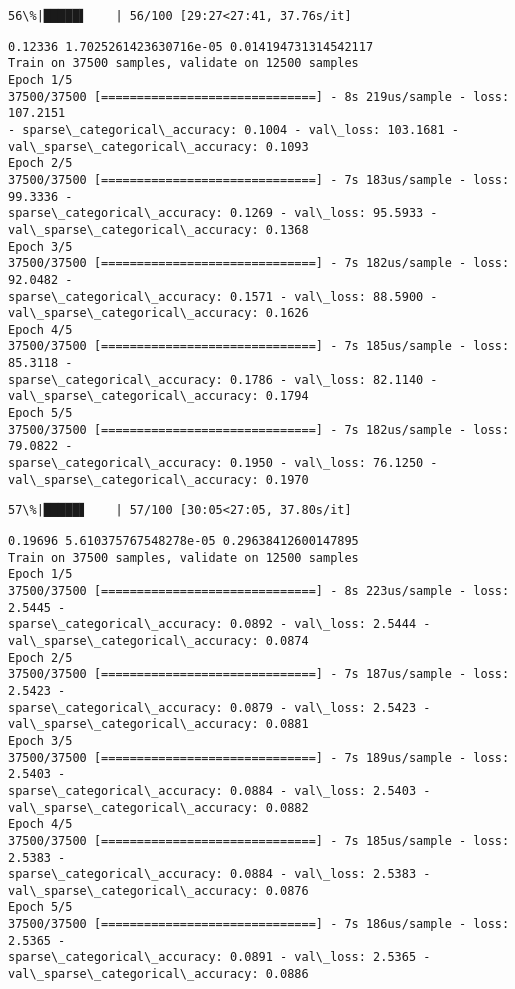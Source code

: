 \documentclass[11pt]{article}
\begin{document}
    \begin{Verbatim}[commandchars=\\\{\}]
 56\%|█████▌    | 56/100 [29:27<27:41, 37.76s/it]
    \end{Verbatim}

    \begin{Verbatim}[commandchars=\\\{\}]
0.12336 1.7025261423630716e-05 0.014194731314542117
Train on 37500 samples, validate on 12500 samples
Epoch 1/5
37500/37500 [==============================] - 8s 219us/sample - loss: 107.2151
- sparse\_categorical\_accuracy: 0.1004 - val\_loss: 103.1681 -
val\_sparse\_categorical\_accuracy: 0.1093
Epoch 2/5
37500/37500 [==============================] - 7s 183us/sample - loss: 99.3336 -
sparse\_categorical\_accuracy: 0.1269 - val\_loss: 95.5933 -
val\_sparse\_categorical\_accuracy: 0.1368
Epoch 3/5
37500/37500 [==============================] - 7s 182us/sample - loss: 92.0482 -
sparse\_categorical\_accuracy: 0.1571 - val\_loss: 88.5900 -
val\_sparse\_categorical\_accuracy: 0.1626
Epoch 4/5
37500/37500 [==============================] - 7s 185us/sample - loss: 85.3118 -
sparse\_categorical\_accuracy: 0.1786 - val\_loss: 82.1140 -
val\_sparse\_categorical\_accuracy: 0.1794
Epoch 5/5
37500/37500 [==============================] - 7s 182us/sample - loss: 79.0822 -
sparse\_categorical\_accuracy: 0.1950 - val\_loss: 76.1250 -
val\_sparse\_categorical\_accuracy: 0.1970
    \end{Verbatim}

    \begin{Verbatim}[commandchars=\\\{\}]
 57\%|█████▋    | 57/100 [30:05<27:05, 37.80s/it]
    \end{Verbatim}

    \begin{Verbatim}[commandchars=\\\{\}]
0.19696 5.610375767548278e-05 0.29638412600147895
Train on 37500 samples, validate on 12500 samples
Epoch 1/5
37500/37500 [==============================] - 8s 223us/sample - loss: 2.5445 -
sparse\_categorical\_accuracy: 0.0892 - val\_loss: 2.5444 -
val\_sparse\_categorical\_accuracy: 0.0874
Epoch 2/5
37500/37500 [==============================] - 7s 187us/sample - loss: 2.5423 -
sparse\_categorical\_accuracy: 0.0879 - val\_loss: 2.5423 -
val\_sparse\_categorical\_accuracy: 0.0881
Epoch 3/5
37500/37500 [==============================] - 7s 189us/sample - loss: 2.5403 -
sparse\_categorical\_accuracy: 0.0884 - val\_loss: 2.5403 -
val\_sparse\_categorical\_accuracy: 0.0882
Epoch 4/5
37500/37500 [==============================] - 7s 185us/sample - loss: 2.5383 -
sparse\_categorical\_accuracy: 0.0884 - val\_loss: 2.5383 -
val\_sparse\_categorical\_accuracy: 0.0876
Epoch 5/5
37500/37500 [==============================] - 7s 186us/sample - loss: 2.5365 -
sparse\_categorical\_accuracy: 0.0891 - val\_loss: 2.5365 -
val\_sparse\_categorical\_accuracy: 0.0886
    \end{Verbatim}
\end{document}
